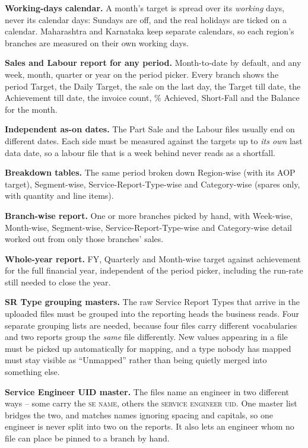 \documentclass[11pt,a4paper]{article}
\newcommand{\col}[1]{\textsc{\small #1}}
\newcommand{\qt}[1]{\textquotedblleft #1\textquotedblright}
\begin{document}
\begin{reqlist}
\item \textbf{Working-days calendar.} A month's target is spread over its \emph{working}
days, never its calendar days: Sundays are off, and the real holidays are ticked on a
calendar. Maharashtra and Karnataka keep separate calendars, so each region's branches
are measured on their own working days.

\item \textbf{Sales and Labour report for any period.} Month-to-date by default, and any
week, month, quarter or year on the period picker. Every branch shows the period Target,
the Daily Target, the sale on the last day, the Target till date, the Achievement till
date, the invoice count, \% Achieved, Short-Fall and the Balance for the month.

\item \textbf{Independent as-on dates.} The Part Sale and the Labour files usually end on
different dates. Each side must be measured against the targets up to \emph{its own} last
data date, so a labour file that is a week behind never reads as a shortfall.

\item \textbf{Breakdown tables.} The same period broken down Region-wise (with its AOP
target), Segment-wise, Service-Report-Type-wise and Category-wise (spares only, with
quantity and line items).

\item \textbf{Branch-wise report.} One or more branches picked by hand, with Week-wise,
Month-wise, Segment-wise, Service-Report-Type-wise and Category-wise detail worked out
from only those branches' sales.

\item \textbf{Whole-year report.} FY, Quarterly and Month-wise target against achievement
for the full financial year, independent of the period picker, including the run-rate
still needed to close the year.

\item \textbf{SR Type grouping masters.} The raw Service Report Types that arrive in the
uploaded files must be grouped into the reporting heads the business reads. Four separate
grouping lists are needed, because four files carry different vocabularies and two
reports group the \emph{same} file differently. New values appearing in a file must be
picked up automatically for mapping, and a type nobody has mapped must stay visible as
\qt{Unmapped} rather than being quietly merged into something else.

\item \textbf{Service Engineer UID master.} The files name an engineer in two different
ways -- some carry the \col{se name}, others the \col{service engineer uid}. One master
list bridges the two, and matches names ignoring spacing and capitals, so one engineer is
never split into two on the reports. It also lets an engineer whom no file can place be
pinned to a branch by hand.


\end{reqlist}
\end{document}
